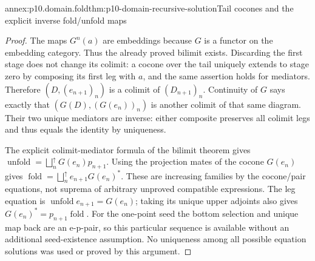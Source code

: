 \begin{annexitem}{annex:p10.domain.fold}{thm:p10-domain-recursive-solution}{Tail cocones and the explicit inverse fold/unfold maps}
\begin{proof}
The maps \(G^n(a)\) are embeddings because \(G\) is a functor
on the embedding category. Thus the already proved bilimit exists.
Discarding the first stage does not change its colimit: a cocone
over the tail uniquely extends to stage zero by composing its
first leg with \(a\), and the same assertion holds for mediators.
Therefore \((D,(e_{n+1})_n)\) is a colimit of \((D_{n+1})_n\).
Continuity of \(G\) says exactly that
\((G(D),(G(e_n))_n)\) is another colimit of that same diagram.
Their two unique mediators are inverse: either composite preserves
all colimit legs and thus equals the identity by uniqueness.

The explicit colimit-mediator formula of the bilimit theorem gives
\(\operatorname{unfold}=\bigsqcup_n^{\uparrow}G(e_n)p_{n+1}\).
Using the projection mates of the cocone \(G(e_n)\) gives
\(\operatorname{fold}=\bigsqcup_n^{\uparrow}e_{n+1}G(e_n)^*\).
These are increasing families by the cocone/pair equations, not
suprema of arbitrary unproved compatible expressions. The leg
equation is \(\operatorname{unfold}e_{n+1}=G(e_n)\);
taking its unique upper adjoints also gives
\(G(e_n)^*=p_{n+1}\operatorname{fold}\).
For the one-point seed the bottom selection and unique map back
are an e-p-pair, so this particular sequence is available without
an additional seed-existence assumption. No uniqueness among
all possible equation solutions was used or proved by this argument.
\end{proof}
\end{annexitem}

